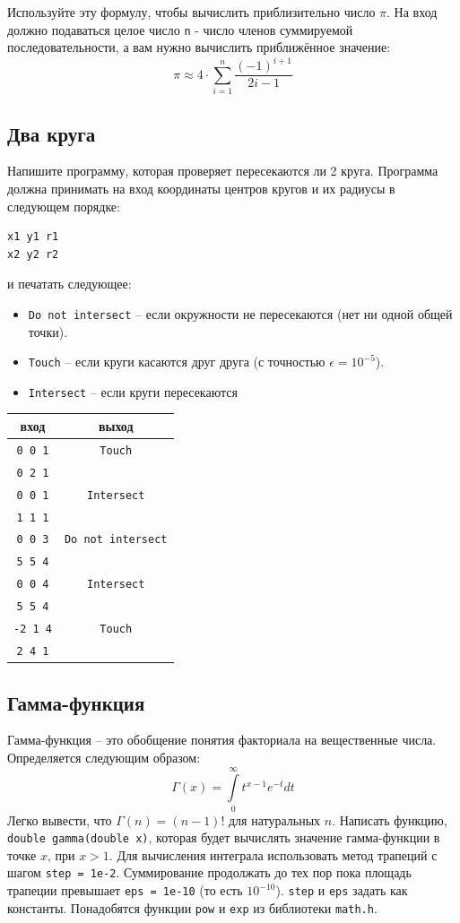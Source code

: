 \documentclass[10pt]{article}
\begin{document}
Используйте эту формулу, чтобы вычислить приблизительно число $\pi$. На вход должно подаваться целое число \texttt{n} - число членов суммируемой последовательности, а вам нужно вычислить приближённое значение:
$$
\pi \approx 4 \cdot \sum_{i=1}^{n} \frac{(-1)^{i + 1}}{2i-1}
$$


\subsection{Два круга}
Напишите программу, которая проверяет пересекаются ли 2 круга. Программа должна принимать на вход координаты центров кругов и их радиусы в следующем порядке:
\begin{verbatim}
x1 y1 r1
x2 y2 r2
\end{verbatim}
и печатать следующее:
\begin{itemize}
\item \texttt{Do not intersect} -- если окружности не пересекаются (нет ни одной общей точки).
\item \texttt{Touch} -- если круги касаются друг друга (с точностью $\epsilon = 10^{-5}$).
\item \texttt{Intersect} -- если круги пересекаются
\end{itemize}

\begin{center}
\begin{tabular}{ c c }
 вход & выход \\ \hline
 \texttt{0 0 1} & \texttt{Touch}  \\ 
 \texttt{0 2 1} &   \\  \hline
 \texttt{0 0 1} & \texttt{Intersect}  \\ 
 \texttt{1 1 1} &   \\  \hline
 \texttt{0 0 3} & \texttt{Do not intersect}  \\ 
 \texttt{5 5 4} &   \\  \hline
 \texttt{0 0 4} & \texttt{Intersect}  \\ 
 \texttt{5 5 4} &   \\  \hline
 \texttt{-2 1 4} & \texttt{Touch}  \\ 
 \texttt{2 4 1} &   \\
\end{tabular}
\end{center}


\subsection{Гамма-функция} 
Гамма-функция -- это обобщение понятия факториала на вещественные числа. Определяется следующим образом:
$$
\Gamma \left( x \right) = \int\limits_0^\infty {t^{x - 1} e^{ - t} dt}
$$
Легко вывести, что $\Gamma(n) = (n - 1)!$ для натуральных $n$. Написать функцию, \texttt{double gamma(double x)}, которая будет вычислять значение гамма-функции в точке $x$, при $x > 1$. Для вычисления интеграла использовать метод трапеций с шагом \texttt{step = 1e-2}. Суммирование продолжать до тех пор пока площадь трапеции превышает \texttt{eps = 1e-10} (то есть $10 ^{-10}$). \texttt{step} и \texttt{eps} задать как константы. Понадобятся функции \texttt{pow} и \texttt{exp} из библиотеки \texttt{math.h}.
\end{document}
